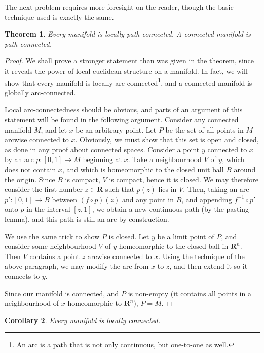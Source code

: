 \documentclass[12pt]{report}
\theoremstyle{plain}
\newtheorem{theorem}{Theorem}[chapter]
\newtheorem{corollary}[theorem]{Corollary}
\theoremstyle{definition}
\begin{document}
The next problem requires more foresight on the reader, though the basic technique used is exactly the same.

\begin{theorem}
    Every manifold is locally path-connected. A connected manifold is path-connected.
\end{theorem}
\begin{proof}
    We shall prove a stronger statement than was given in the theorem, since it reveals the power of local euclidean structure on a manifold. In fact, we will show that every manifold is locally arc-connected\footnote{An arc is a path that is not only continuous, but one-to-one as well.}, and a connected manifold is globally arc-connected.

    Local arc-connectedness should be obvious, and parts of an argument of this statement will be found in the following argument. Consider any connected manifold $M$, and let $x$ be an arbitrary point. Let $P$ be the set of all points in $M$ arcwise connected to $x$. Obviously, we must show that this set is open and closed, as done in any proof about connected spaces. Consider a point $y$ connected to $x$ by an arc $p:[0,1] \to M$ beginning at $x$. Take a neighbourhood $V$ of $y$, which does not contain $x$, and which is homeomorphic to the closed unit ball $\overline{B}$ around the origin. Since $\overline{B}$ is compact, $V$ is compact, hence it is closed. We may therefore consider the first number $z \in \mathbf{R}$ such that $p(z)$ lies in $V$. Then, taking an arc $p':[0,1] \to \overline{B}$ between $(f \circ p)(z)$ and any point in $\overline{B}$, and appending $f^{-1} \circ p'$ onto $p$ in the interval $[z,1]$, we obtain a new continuous path (by the pasting lemma), and this path is still an arc by construction.


    We use the same trick to show $P$ is closed. Let $y$ be a limit point of $P$, and consider some neighbourhood $V$ of $y$ homeomorphic to the closed ball in $\mathbf{R}^n$. Then $V$ contains a point $z$ arcwise connected to $x$. Using the technique of the above paragraph, we may modify the arc from $x$ to $z$, and then extend it so it connects to $y$.

    Since our manifold is connected, and $P$ is non-empty (it contains all points in a neighbourhood of $x$ homeomorphic to $\mathbf{R}^n$), $P = M$.
\end{proof}

\begin{corollary}
    Every manifold is locally connected.
\end{corollary}
\end{document}
